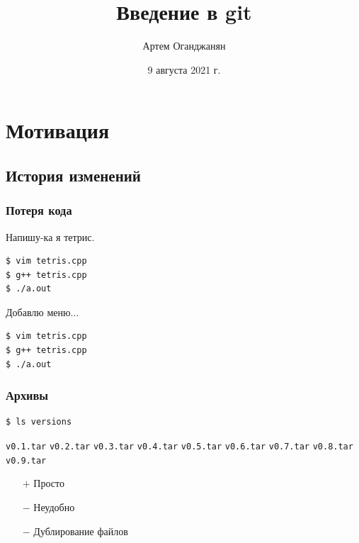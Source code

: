 \documentclass[pdf,russian]{beamer}
\title{Введение в git}
\author{Артем Оганджанян}
\institute{ЛОЛ-2021}
\date{9 августа 2021 г.}
\begin{document}

\begin{frame}
    \titlepage
\end{frame}

\section{Мотивация}

\subsection{История изменений}

\begin{frame}[fragile]
    \frametitle{Потеря кода}
    \pause
    Напишу-ка я тетрис.
    \begin{block}{}
        \begin{verbatim}
$ vim tetris.cpp
$ g++ tetris.cpp
$ ./a.out
        \end{verbatim}
    \end{block}
    \pause
    Добавлю меню...
    \begin{block}{}
        \begin{verbatim}
$ vim tetris.cpp
$ g++ tetris.cpp
$ ./a.out
        \end{verbatim}
    \end{block}
    \pause
\end{frame}

\begin{frame}[fragile]
    \frametitle{Архивы}
    \begin{block}{}
        \begin{verbatim}
$ ls versions
        \end{verbatim}
        \texttt{\textcolor[HTML]{aa0000}{v0.1.tar}} \quad
        \texttt{\textcolor[HTML]{aa0000}{v0.2.tar}} \quad
        \pause
        \texttt{\textcolor[HTML]{aa0000}{v0.3.tar}} \quad
        \texttt{\textcolor[HTML]{aa0000}{v0.4.tar}} \quad
        \texttt{\textcolor[HTML]{aa0000}{v0.5.tar}} \quad
        \texttt{\textcolor[HTML]{aa0000}{v0.6.tar}} \quad
        \texttt{\textcolor[HTML]{aa0000}{v0.7.tar}} \quad
        \texttt{\textcolor[HTML]{aa0000}{v0.8.tar}} \quad
        \texttt{\textcolor[HTML]{aa0000}{v0.9.tar}}
    \end{block}
    \begin{itemize}
        \pause
        \item[$+$] Просто
        \pause
        \item[$-$] Неудобно
        \pause
        \item[$-$] Дублирование файлов
    \end{itemize}
\end{frame}
\end{document}
